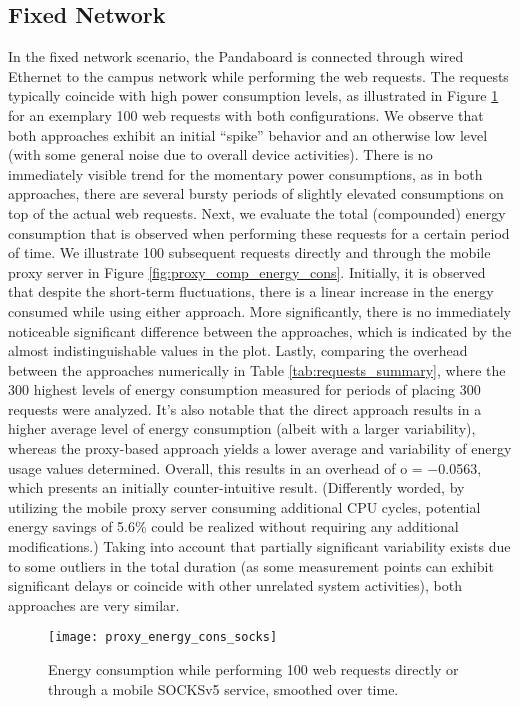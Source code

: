 \subsection*{Fixed Network}
In the fixed network scenario, the Pandaboard is connected
through wired Ethernet to the campus network while performing
the web requests. The requests typically coincide
with high power consumption levels, as illustrated in Figure \ref{fig:proxy_energy_cons_socks}
for an exemplary 100 web requests with both configurations.
We observe that both approaches exhibit an initial “spike”
behavior and an otherwise low level (with some general noise
due to overall device activities). There is no immediately
visible trend for the momentary power consumptions, as in
both approaches, there are several bursty periods of slightly
elevated consumptions on top of the actual web requests.
Next, we evaluate the total (compounded) energy consumption
that is observed when performing these requests for a
certain period of time. We illustrate 100 subsequent requests
directly and through the mobile proxy server in Figure \ref{fig:proxy_comp_energy_cons}.
Initially, it is observed that despite the short-term fluctuations,
there is a linear increase in the energy consumed
while using either approach. More significantly, there is no
immediately noticeable significant difference between the
approaches, which is indicated by the almost indistinguishable
values in the plot. Lastly, comparing the overhead between
the approaches numerically in Table \ref{tab:requests_summary}, where the
300 highest levels of energy consumption measured for periods
of placing 300 requests were analyzed. It's also notable that the direct approach
results in a higher average level of energy consumption (albeit
with a larger variability), whereas the proxy-based approach
yields a lower average and variability of energy usage values
determined. Overall, this results in an overhead of o =
−0.0563, which presents an initially counter-intuitive result.
(Differently worded, by utilizing the mobile proxy server
consuming additional CPU cycles, potential energy savings
of 5.6\% could be realized without requiring any additional
modifications.) Taking into account that partially significant
variability exists due to some outliers in the total duration
(as some measurement points can exhibit significant delays or
coincide with other unrelated system activities), both approaches are very similar.

\begin{figure}
\centering
\texttt{[image: proxy\_energy\_cons\_socks]}
\caption{Energy consumption while performing 100 web requests directly or through a mobile SOCKSv5 service, smoothed over time.}
\label{fig:proxy_energy_cons_socks}
\end{figure}

